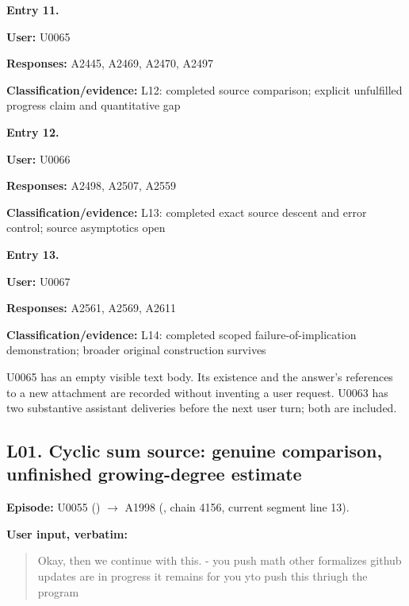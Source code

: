 \documentclass[10pt,a4paper,oneside]{report}
\begin{document}

\textbf{Entry 11.}

\textbf{User:} U0065

\textbf{Responses:} A2445, A2469, A2470, A2497

\textbf{Classification/evidence:} L12: completed source comparison;
explicit unfulfilled progress claim and quantitative gap


\textbf{Entry 12.}

\textbf{User:} U0066

\textbf{Responses:} A2498, A2507, A2559

\textbf{Classification/evidence:} L13: completed exact source descent
and error control; source asymptotics open


\textbf{Entry 13.}

\textbf{User:} U0067

\textbf{Responses:} A2561, A2569, A2611

\textbf{Classification/evidence:} L14: completed scoped
failure-of-implication demonstration; broader original construction
survives

U0065 has an empty visible text body. Its existence and the answer's
references to a new attachment are recorded without inventing a user
request. U0063 has two substantive assistant deliveries before the next
user turn; both are included.

\subsection{L01. Cyclic sum source: genuine comparison, unfinished
growing-degree
estimate}\label{l01.-cyclic-sum-source-genuine-comparison-unfinished-growing-degree-estimate}

\textbf{Episode:} U0055
(\protect{})
\allowbreak{}\ensuremath{→}\allowbreak{} A1998
(\protect{}, chain 4156,
current segment line 13).

\textbf{User input, verbatim:}

\begin{quote}
Okay, then we continue with this. - you push math other formalizes
github updates are in progress it remains for you yto push this thriugh
the program
\end{quote}
\end{document}
